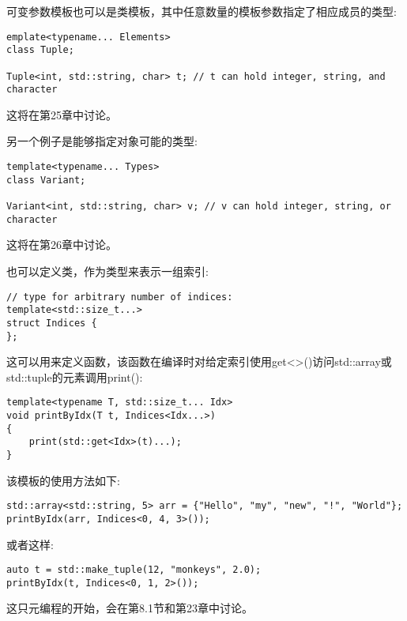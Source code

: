 可变参数模板也可以是类模板，其中任意数量的模板参数指定了相应成员的类型:

\begin{lstlisting}[style=styleCXX]
emplate<typename... Elements>
class Tuple;

Tuple<int, std::string, char> t; // t can hold integer, string, and character
\end{lstlisting}

这将在第25章中讨论。

另一个例子是能够指定对象可能的类型:

\begin{lstlisting}[style=styleCXX]
template<typename... Types>
class Variant;

Variant<int, std::string, char> v; // v can hold integer, string, or character
\end{lstlisting}

这将在第26章中讨论。

也可以定义类，作为类型来表示一组索引:

\begin{lstlisting}[style=styleCXX]
// type for arbitrary number of indices:
template<std::size_t...>
struct Indices {
};
\end{lstlisting}

这可以用来定义函数，该函数在编译时对给定索引使用get<>()访问std::array或std::tuple的元素调用print():

\begin{lstlisting}[style=styleCXX]
template<typename T, std::size_t... Idx>
void printByIdx(T t, Indices<Idx...>)
{
	print(std::get<Idx>(t)...);
}
\end{lstlisting}

该模板的使用方法如下:

\begin{lstlisting}[style=styleCXX]
std::array<std::string, 5> arr = {"Hello", "my", "new", "!", "World"};
printByIdx(arr, Indices<0, 4, 3>());
\end{lstlisting}

或者这样:

\begin{lstlisting}[style=styleCXX]
auto t = std::make_tuple(12, "monkeys", 2.0);
printByIdx(t, Indices<0, 1, 2>());
\end{lstlisting}

这只元编程的开始，会在第8.1节和第23章中讨论。


